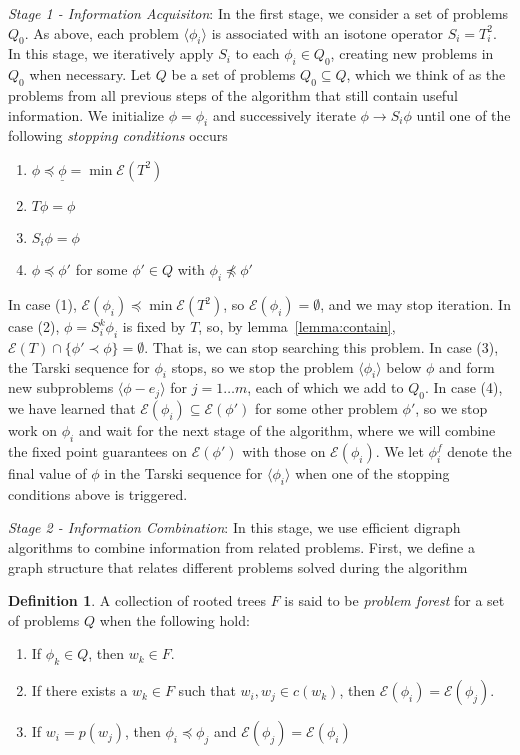 \documentclass[11pt,reqno]{amsart}
\theoremstyle{definition}
\newtheorem{defn}[thm]{Definition}
\numberwithin{equation}{section}
\newcommand{\ul}{\underline}
\newcommand{\lag}{\langle}
\newcommand{\rag}{\rangle}
\newcommand{\pre}{\phi}
\newcommand{\sub}{\subseteq}
\newcommand{\fix}{\mathcal{E}}
\newcommand{\peq}{\preceq}
\newcommand{\pe}{\prec}
\newcommand{\acto}{Q_0}
\newcommand{\act}{Q}
\newcommand{\pref}{\pre^{f}}
\newcommand{\forest}{F}
\begin{document}
\emph{Stage 1 - Information Acquisiton}: In the first stage, we consider a set of problems $\acto$.
As above, each problem $\lag \pre_i \rag$ is associated with an isotone operator $S_i = T_i^2$.
In this stage, we iteratively apply $S_i$ to each $\pre_i \in \acto$, creating new problems in $\acto$ when necessary.
Let $\act$ be a set of problems $\acto \sub \act$, which we think of as the problems from all previous steps of the algorithm that still contain useful information.  
We initialize $\pre = \pre_i$ and successively iterate $\pre \to S_i \pre$ until one of the following \emph{stopping conditions} occurs
\begin{enumerate}
\item $\pre \peq \ul{\pre} = \min \fix(T^2)$ 
\item $T \pre = \pre$
\item $S_i \pre = \pre$
\item $\pre \peq \pre'$ for some $\pre' \in Q$ with $\pre_i \not \peq \pre'$ 
\end{enumerate} 

In case (1), $\fix(\pre_i) \peq \min \fix(T^2)$, so $\fix(\pre_i) = \emptyset$, and we may stop iteration. 
In case (2), $\pre = S_i^k \pre_i$ is fixed by $T$, so, by lemma~\ref{lemma:contain}, $\fix(T) \cap \{\pre' \pe \pre \} = \emptyset$.
That is, we can stop searching this problem.
In case (3), the Tarski sequence for $\pre_i$ stops, so we stop the problem $\lag \pre_i \rag$ below $\pre$ and form new subproblems $\lag \pre - e_j \rag$ for $j = 1 \hdots m$, each of which we add to $\acto$.  
In case (4), we have learned that $\fix(\pre_i) \sub \fix(\pre')$ for some other problem $\pre'$, so we stop work on $\pre_i$ and wait for the next stage of the algorithm, where we will combine the fixed point guarantees on $\fix(\pre')$ with those on $\fix(\pre_i)$.
We let $\pref_i$ denote the final value of $\pre$ in the Tarski sequence for $\lag \pre_i \rag$ when one of the stopping conditions above is triggered. 

\emph{Stage 2 - Information Combination}: In this stage, we use efficient digraph algorithms to combine information from related problems.
First, we define a graph structure that relates different problems solved during the algorithm
\begin{defn} \label{def:forest}
A collection of rooted trees $\forest$ is said to be \emph{problem forest} for a set of problems $\act$ when the following hold:

\begin{enumerate}
\item If $\pre_k \in Q$, then $w_k \in \forest$. \label{def:forest1}
\item If there exists a $w_k \in F$ such that $w_i, w_j \in c(w_k)$, then $\fix(\pre_i) = \fix(\pre_j)$. \label{def:forest2}
\item If $w_i = p(w_j)$, then $\pre_i \peq \pre_j$ and $\fix(\pre_j) = \fix(\pre_i)$ \label{def:forest3} 
\end{enumerate} 

\end{defn}
\end{document}
